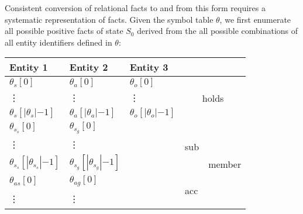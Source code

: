 \documentclass[10pt, twocolumn]{article}
\begin{document}
          Consistent conversion of relational facts to and from this form
          requires a systematic representation of facts. Given the symbol table
          $\theta$, we first enumerate all possible positive facts of state
          $S_{0}$ derived from the all possible combinations of all entity
          identifiers defined in $\theta$:

          \begin{tabular}[t]{|l|l|l|l|l|}
            \hline
            \textbf{Entity 1} &
            \textbf{Entity 2} &
            \textbf{Entity 3} &
            \multicolumn{2}{|l|}{\textbf{}} \\
            \hline
            ${\theta}_{s}[0]$ &
            ${\theta}_{a}[0]$ &
            ${\theta}_{o}[0]$ &
            \multicolumn{2}{|c|}{\multirow{3}{*}{\begin{sideways}holds\end{sideways}}} \\
            \vdots & \vdots & \vdots & \multicolumn{2}{|c|}{} \\
            ${\theta}_{s}[|{\theta}_{s}|{-1}]$ &
            ${\theta}_{a}[|{\theta}_{a}|{-1}]$ &
            ${\theta}_{o}[|{\theta}_{o}|{-1}]$ &
            \multicolumn{2}{|c|}{} \\
            \hline
            ${\theta}_{s_s}[0]$ &
            ${\theta}_{s_g}[0]$ &
            &
            \multirow{3}{*}{\begin{sideways}sub\end{sideways}} &
            \multirow{9}{*}{\begin{sideways}member\end{sideways}} \\
            \vdots & \vdots & & & \\
            ${\theta}_{s_s}[|{\theta}_{s_s}|{-1}]$ & ${\theta}_{s_g}[|{\theta}_{s_g}|{-1}]$ & & & \\
            \cline{1-4}
            ${\theta}_{as}[0]$ &
            ${\theta}_{ag}[0]$ &
            &
            \multirow{3}{*}{\begin{sideways}acc\end{sideways}} & \\
            \vdots & \vdots & & & \\

\end{tabular}
\end{document}
